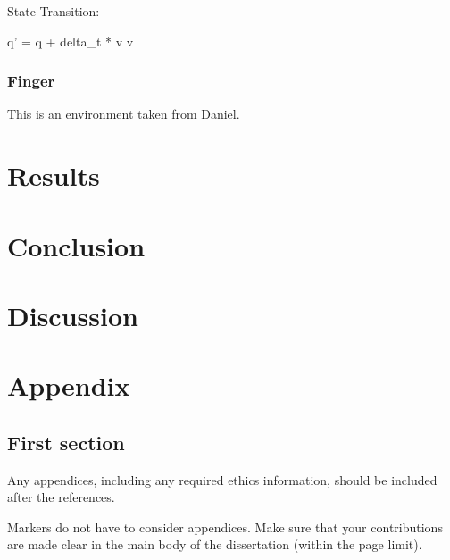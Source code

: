 \documentclass[logo,bsc,singlespacing,parskip]{infthesis}
\begin{document}
State Transition:

q' = q + delta_t * v
v

\subsection*{Finger}

This is an environment taken from Daniel.

\chapter{Results}

\chapter{Conclusion}

\chapter{Discussion}


% 




\appendix

\chapter{Appendix}

\section{First section}

Any appendices, including any required ethics information, should be included
after the references.

Markers do not have to consider appendices. Make sure that your contributions
are made clear in the main body of the dissertation (within the page limit).
\end{document}
